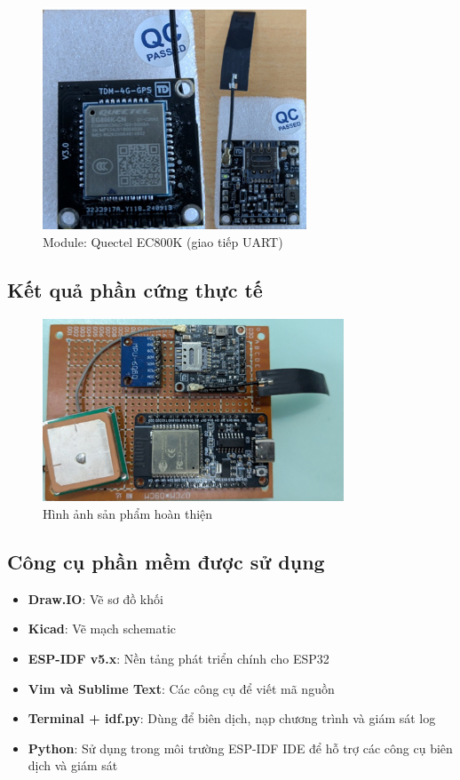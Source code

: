 \documentclass[a4paper,12pt]{report}
\begin{document}
	\begin{figure}[h]
		\centering
		\includegraphics[width=0.7\textwidth]{real_sim_modul.png}
		\caption{Module: Quectel EC800K (giao tiếp UART)}
		\label{fig:quectel_module}
	\end{figure}
	
	\newpage
	\subsection{Kết quả phần cứng thực tế }
	
	\begin{figure}[h]
		\centering
		\includegraphics[width=0.8\textwidth]{real_composed_mainboard_upside.png}
		\caption{Hình ảnh sản phẩm hoàn thiện}
		\label{fig:final_product}
	\end{figure}
	
	
	\subsection{Công cụ phần mềm được sử dụng}
	
	\begin{itemize}
		\item \textbf{Draw.IO}: Vẽ sơ đồ khối
		\item \textbf{Kicad}: Vẽ mạch schematic
		\item \textbf{ESP-IDF v5.x}: Nền tảng phát triển chính cho ESP32
		\item \textbf{Vim và Sublime Text}: Các công cụ để viết mã nguồn
		\item \textbf{Terminal + idf.py}: Dùng để biên dịch, nạp chương trình và giám sát log
		\item \textbf{Python}: Sử dụng trong môi trường ESP-IDF IDE để hỗ trợ các công cụ biên dịch và giám sát
	\end{itemize}
	
\end{document}
